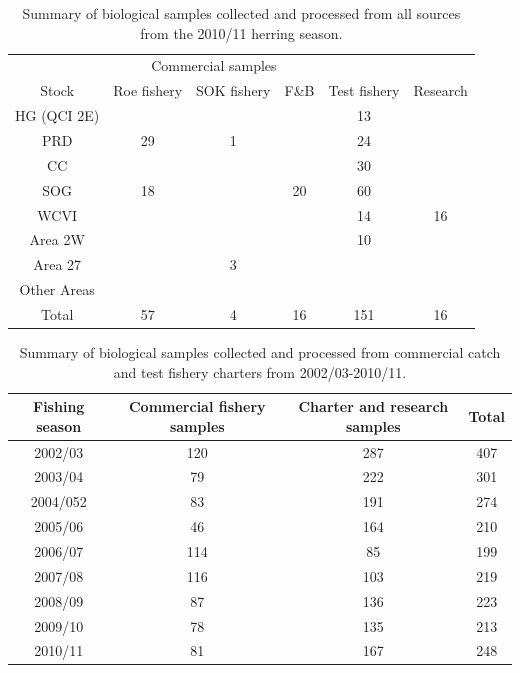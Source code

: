 \begin{table}
	\caption{Summary of biological samples collected and processed from all sources from the 2010/11 herring season.}
	\label{table:PartII:bioSamples}
	\begin{center}
		\begin{tabular}{cccccc}
		\hline
		& \multicolumn{3}{c}{Commercial samples} &  \\
		Stock & Roe fishery & SOK fishery & F\&B & Test fishery & Research\\
		\hline
		HG (QCI 2E) &  &  &  & 13\\
		PRD & 29 & 1 &  & 24\\
		CC &  &  &  & 30\\
		SOG & 18 &  & 20 & 60\\
		WCVI &  &  &  & 14 & 16\\
		Area 2W &  &  &  & 10\\
		Area 27 &  & 3\\
		Other Areas\\
		\hline
		Total & 57 & 4 & 16 & 151 & 16\\
		\hline
		\end{tabular}
	\end{center}
\end{table}

\begin{table}
	\caption{Summary of biological samples collected and processed from commercial catch and test fishery charters from 2002/03-2010/11.}
	\label{table:PartII:sampleSizes}
	\begin{center}
\begin{tabular}{cccc}
\hline
Fishing season & Commercial fishery samples & Charter and research samples & Total\\
\hline
2002/03 & 120 & 287 & 407\\
2003/04 & 79 & 222 & 301\\
2004/052 & 83 & 191 & 274\\
2005/06 & 46 & 164 & 210\\
2006/07 & 114 & 85 & 199\\
2007/08 & 116 & 103 & 219\\
2008/09 & 87 & 136 & 223\\
2009/10 & 78 & 135 & 213\\
2010/11 & 81 & 167 & 248\\
\hline
\end{tabular}
	
	\end{center}
\end{table}
	
